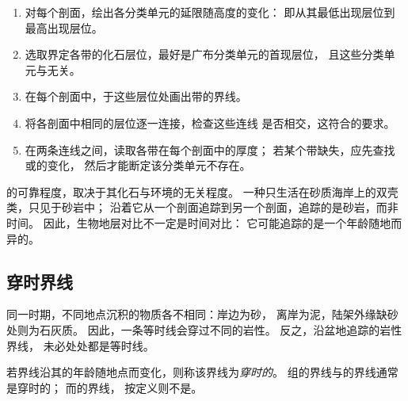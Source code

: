 \begin{method}[按生物带对比剖面]\label{met:b1:stratigraphic-scale:biozones}
\begin{enumerate}
  \item 对每个剖面，绘出各分类单元的延限随高度的变化：
        即从其最低出现层位到最高出现层位。
  \item 选取界定各带的化石层位，最好是广布分类单元的首现层位，
        且这些分类单元与无关。
  \item 在每个剖面中，于这些层位处画出带的界线。
  \item 将各剖面中相同的层位逐一连接，检查这些连线
        是否相交，这符合的要求。
  \item 在两条连线之间，读取各带在每个剖面中的厚度；
        若某个带缺失，应先查找或的变化，
        然后才能断定该分类单元不存在。
\end{enumerate}
\end{method}

的可靠程度，取决于其化石与环境的无关程度。
一种只生活在砂质海岸上的双壳类，只见于砂岩中；
沿着它从一个剖面追踪到另一个剖面，追踪的是砂岩，而非时间。
因此，生物地层对比不一定是时间对比：
它可能追踪的是一个年龄随地而异的。

\subsection*{穿时界线}

同一时期，不同地点沉积的物质各不相同：岸边为砂，
离岸为泥，陆架外缘缺砂处则为石灰质。
因此，一条等时线会穿过不同的岩性。
反之，沿盆地追踪的岩性界线，
未必处处都是等时线。

\begin{definition}[穿时界线]\label{def:b1:stratigraphic-scale:diachronous}
若界线沿其的年龄随地点而变化，则称该界线为\emph{穿时的}。
组的界线与的界线通常是穿时的；
而的界线，
按定义则不是。
\end{definition}

